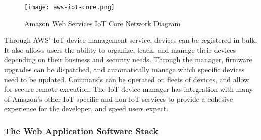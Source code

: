 \begin{figure}
  \centering
  \texttt{[image: aws-iot-core.png]}
  \caption{Amazon Web Services IoT Core Network Diagram}
  \label{aws-iot-core}
\end{figure}

Through AWS' IoT device management service, devices can be registered in bulk.
It also allows users the ability to organize, track, and manage their devices
depending on their business and security needs. Through the manager, firmware
upgrades can be dispatched, and automatically manage which specific devices need
to be updated. Commands can be operated on fleets of devices, and allow for
secure remote execution. The IoT device manager has integration with many of
Amazon's other IoT specific and non-IoT services to provide a cohesive
experience for the developer, and speed users expect.

\subsubsection{The Web Application Software Stack}

